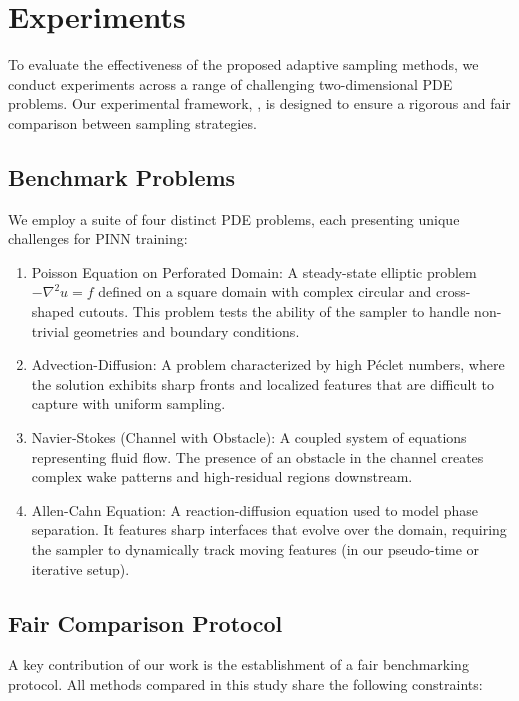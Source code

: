 \section{Experiments}
\label{sec:experiments}

To evaluate the effectiveness of the proposed adaptive sampling methods, we conduct experiments across a range of challenging two-dimensional PDE problems. Our experimental framework, \pinnpoint, is designed to ensure a rigorous and fair comparison between sampling strategies.

\subsection{Benchmark Problems}

We employ a suite of four distinct PDE problems, each presenting unique challenges for PINN training:

\begin{enumerate}
    \item Poisson Equation on Perforated Domain: A steady-state elliptic problem $-\nabla^2 u = f$ defined on a square domain with complex circular and cross-shaped cutouts. This problem tests the ability of the sampler to handle non-trivial geometries and boundary conditions.
    \item Advection-Diffusion: A problem characterized by high P\'{e}clet numbers, where the solution exhibits sharp fronts and localized features that are difficult to capture with uniform sampling.
    \item Navier-Stokes (Channel with Obstacle): A coupled system of equations representing fluid flow. The presence of an obstacle in the channel creates complex wake patterns and high-residual regions downstream.
    \item Allen-Cahn Equation: A reaction-diffusion equation used to model phase separation. It features sharp interfaces that evolve over the domain, requiring the sampler to dynamically track moving features (in our pseudo-time or iterative setup).
\end{enumerate}

\subsection{Fair Comparison Protocol}

A key contribution of our work is the establishment of a fair benchmarking protocol. All methods compared in this study share the following constraints:

